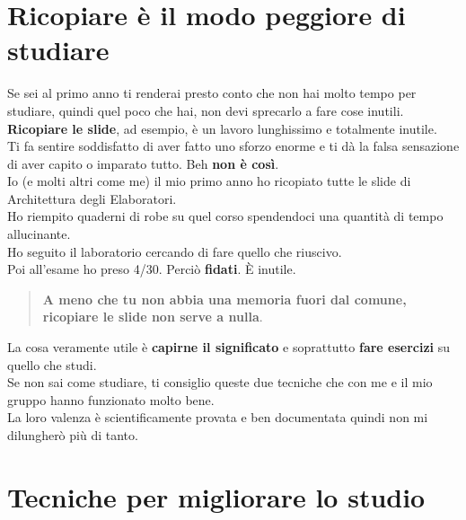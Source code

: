 \documentclass{article}
\begin{document}
\section{Ricopiare è il modo peggiore di studiare}
Se sei al primo anno ti renderai presto conto che non hai molto tempo per studiare, quindi quel poco che hai, non devi sprecarlo a fare cose inutili.\\
\textbf{Ricopiare le slide}, ad esempio, è un lavoro lunghissimo e totalmente inutile.\\
Ti fa sentire soddisfatto di aver fatto uno sforzo enorme e ti dà la falsa sensazione di aver capito o imparato tutto. 
Beh \textbf{non è così}.\\
Io (e molti altri come me) il mio primo anno ho ricopiato tutte le slide di Architettura degli Elaboratori.\\
Ho riempito quaderni di robe su quel corso spendendoci una quantità di tempo allucinante.\\
Ho seguito il laboratorio cercando di fare quello che riuscivo.\\
Poi all'esame ho preso 4/30. Perciò \textbf{fidati}. È inutile.
\begin{quote}
\textbf{A meno che tu non abbia una memoria fuori dal comune, ricopiare le slide non serve a nulla}.
\end{quote}%
La cosa veramente utile è \textbf{capirne il significato} e soprattutto \textbf{fare esercizi} su quello che studi.\\
Se non sai come studiare, ti consiglio queste due tecniche che con me e il mio gruppo hanno funzionato molto bene.\\
La loro valenza è scientificamente provata e ben documentata quindi non mi dilungherò più di tanto.


\section{Tecniche per migliorare lo studio}
\end{document}
